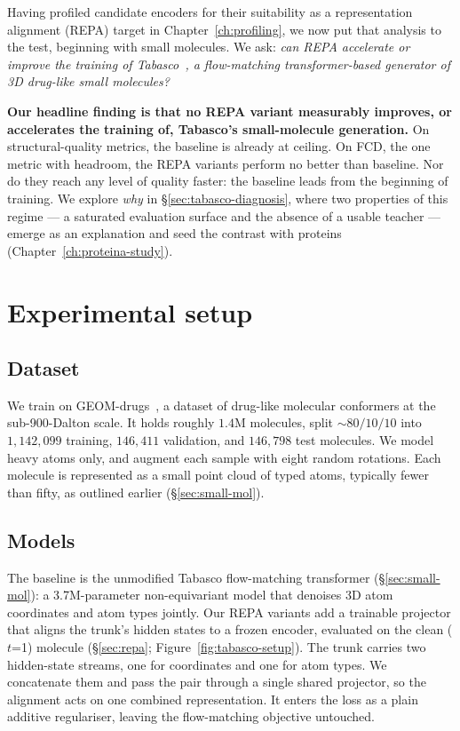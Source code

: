 \documentclass[12pt,a4paper,twoside]{report}
\begin{document}
Having profiled candidate encoders for their suitability as a representation alignment (REPA) target in Chapter~\ref{ch:profiling}, we now put that analysis to the test, beginning with small molecules. We ask: \emph{can REPA accelerate or improve the training of Tabasco~\cite{Tabasco}, a flow-matching transformer-based generator of 3D drug-like small molecules?}

\textbf{Our headline finding is that no REPA variant measurably improves, or accelerates the training of, Tabasco's small-molecule generation.} On structural-quality metrics, the baseline is already at ceiling. On FCD, the one metric with headroom, the REPA variants perform no better than baseline. Nor do they reach any level of quality faster: the baseline leads from the beginning of training. We explore \emph{why} in \S\ref{sec:tabasco-diagnosis}, where two properties of this regime --- a saturated evaluation surface and the absence of a usable teacher --- emerge as an explanation and seed the contrast with proteins (Chapter~\ref{ch:proteina-study}).

\section{Experimental setup}
\label{sec:tabasco-setup}

\subsection{Dataset}
\label{sec:tabasco-data}

We train on GEOM-drugs~\cite{GEOMdrugs}, a dataset of drug-like molecular conformers at the sub-900-Dalton scale. It holds roughly $1.4$M molecules, split ${\sim}80/10/10$ into $1{,}142{,}099$ training, $146{,}411$ validation, and $146{,}798$ test molecules. We model heavy atoms only, and augment each sample with eight random rotations. Each molecule is represented as a small point cloud of typed atoms, typically fewer than fifty, as outlined earlier (\S\ref{sec:small-mol}).

\subsection{Models}
\label{sec:tabasco-models}

The baseline is the unmodified Tabasco flow-matching transformer (\S\ref{sec:small-mol}): a 3.7M-parameter non-equivariant model that denoises 3D atom coordinates and atom types jointly. Our REPA variants add a trainable projector that aligns the trunk's hidden states to a frozen encoder, evaluated on the clean ($t$=1) molecule (\S\ref{sec:repa}; Figure~\ref{fig:tabasco-setup}). The trunk carries two hidden-state streams, one for coordinates and one for atom types. We concatenate them and pass the pair through a single shared projector, so the alignment acts on one combined representation. It enters the loss as a plain additive regulariser, leaving the flow-matching objective untouched.
\end{document}

